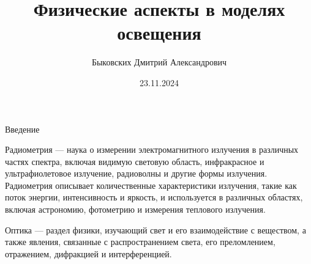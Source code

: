 \documentclass{beamer}
\title[Физические аспекты]{Физические аспекты в моделях освещения}
\author[Быковских Д.А.]{Быковских Дмитрий Александрович}
\date{23.11.2024}
\begin{document}
	\begin{frame}
		\titlepage
	\end{frame}

	\begin{frame}{Введение}

		Радиометрия --- наука о измерении электромагнитного излучения в различных частях спектра, включая видимую световую область, инфракрасное и ультрафиолетовое излучение, радиоволны и другие формы излучения. \\
		Радиометрия описывает количественные характеристики излучения, такие как поток энергии, интенсивность и яркость, и используется в различных областях, включая астрономию, фотометрию и измерения теплового излучения.
		
		\vspace{0.15cm}
		Оптика --- раздел физики, изучающий свет и его взаимодействие с веществом, а также явления, связанные с распространением света, его преломлением, отражением, дифракцией и интерференцией.
			
	\end{frame}
\end{document}
